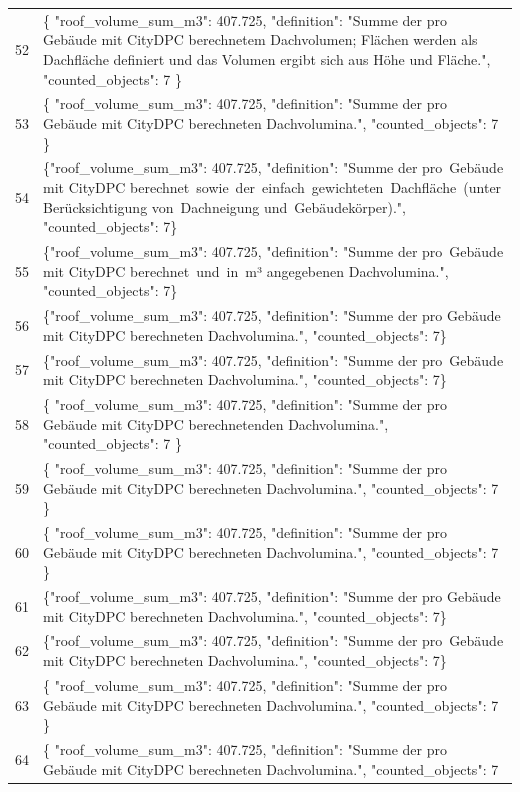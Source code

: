 \documentclass[a4paper,11pt]{article}
\begin{document}
\begin{table}[ht]
\begin{tabular}{r p{12cm}}
52 & \{
  "roof\_volume\_sum\_m3": 407.725,
  "definition": "Summe der pro Gebäude mit CityDPC berechnetem Dachvolumen; Flächen werden als Dachfläche definiert und das Volumen ergibt sich aus Höhe und Fläche.",
  "counted\_objects": 7
\} \\
53 & \{
  "roof\_volume\_sum\_m3": 407.725,
  "definition": "Summe der pro Gebäude mit CityDPC berechnet­en Dachvolumina.",
  "counted\_objects": 7
\} \\
54 & \{"roof\_volume\_sum\_m3": 407.725, "definition": "Summe der pro Gebäude mit CityDPC berechnet sowie der einfach gewichteten Dachfläche (unter Berücksichtigung von Dachneigung und Gebäudekörper).", "counted\_objects": 7\} \\
55 & \{"roof\_volume\_sum\_m3": 407.725, "definition": "Summe der pro Gebäude mit CityDPC berechnet und in m³ angegebenen Dachvolumina.", "counted\_objects": 7\} \\
56 & \{"roof\_volume\_sum\_m3": 407.725, "definition": "Summe der pro Gebäude mit CityDPC berechneten Dachvolumina.", "counted\_objects": 7\} \\
57 & \{"roof\_volume\_sum\_m3": 407.725, "definition": "Summe der pro Gebäude mit CityDPC berechneten Dachvolumina.", "counted\_objects": 7\} \\
58 & \{
  "roof\_volume\_sum\_m3": 407.725,
  "definition": "Summe der pro Gebäude mit CityDPC berechnetenden Dachvolumina.",
  "counted\_objects": 7
\} \\
59 & \{
  "roof\_volume\_sum\_m3": 407.725,
  "definition": "Summe der pro Gebäude mit CityDPC berechneten Dachvolumina.",
  "counted\_objects": 7
\} \\
60 & \{
  "roof\_volume\_sum\_m3": 407.725,
  "definition": "Summe der pro Gebäude mit CityDPC berechneten Dachvolumina.",
  "counted\_objects": 7
\} \\
61 & \{"roof\_volume\_sum\_m3": 407.725, "definition": "Summe der pro Gebäude mit CityDPC berechneten Dachvolumina.", "counted\_objects": 7\} \\
62 & \{"roof\_volume\_sum\_m3": 407.725, "definition": "Summe der pro Gebäude mit CityDPC berechneten Dachvolumina.", "counted\_objects": 7\} \\
63 & \{
  "roof\_volume\_sum\_m3": 407.725,
  "definition": "Summe der pro Gebäude mit CityDPC berechneten Dachvolumina.",
  "counted\_objects": 7
\} \\
64 & \{
  "roof\_volume\_sum\_m3": 407.725,
  "definition": "Summe der pro Gebäude mit CityDPC berechneten Dachvolumina.",
  "counted\_objects": 7

\end{tabular}
\end{table}
\end{document}
